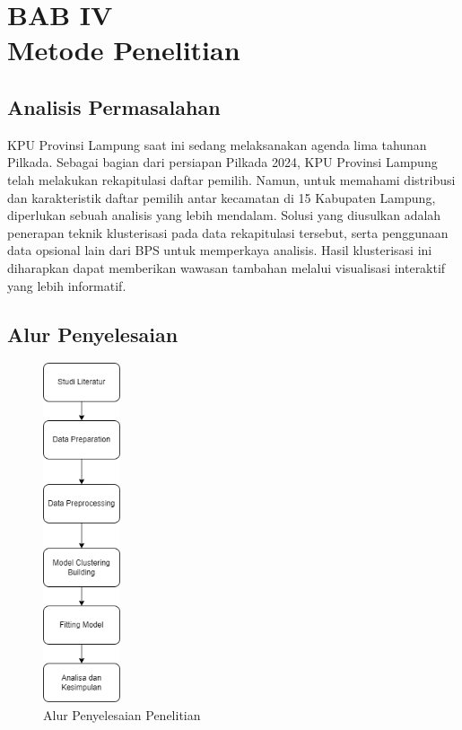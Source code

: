 \section*{\centering BAB IV \\ Metode Penelitian}


\setcounter{section}{4}
\setcounter{subsection}{0}  %
\setcounter{figure}{0}
\renewcommand{\thefigure}{\thesection.\arabic{figure}}

\subsection{Analisis Permasalahan}
KPU Provinsi Lampung saat ini sedang melaksanakan agenda lima tahunan Pilkada. Sebagai bagian dari persiapan Pilkada 2024, KPU Provinsi Lampung telah melakukan rekapitulasi daftar pemilih. Namun, untuk memahami distribusi dan karakteristik daftar pemilih antar kecamatan di 15 Kabupaten Lampung, diperlukan sebuah analisis yang lebih mendalam. Solusi yang diusulkan adalah penerapan teknik klusterisasi pada data rekapitulasi tersebut, serta penggunaan data opsional lain dari BPS untuk memperkaya analisis. Hasil klusterisasi ini diharapkan dapat memberikan wawasan tambahan melalui visualisasi interaktif yang lebih informatif.

\subsection{Alur Penyelesaian}
\begin{figure}[h]
    \centering
    \includegraphics[width=0.2\linewidth, height=10cm]{images/flow.png}
    \caption{Alur Penyelesaian Penelitian}
    \label{fig:flow}
\end{figure}

